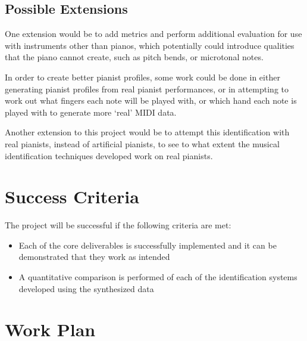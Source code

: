 \documentclass[12pt]{article}
\begin{document}
\subsection{Possible Extensions}
One extension would be to add metrics and perform additional evaluation for use with instruments other than pianos, which potentially could introduce qualities that the piano cannot create, such as pitch bends, or microtonal notes.

In order to create better pianist profiles, some work could be done in either generating pianist profiles from real pianist performances, or in attempting to work out what fingers each note will be played with, or which hand each note is played with to generate more ‘real’ MIDI data.

Another extension to this project would be to attempt this identification with real pianists, instead of artificial pianists, to see to what extent the musical identification techniques developed work on real pianists.

\section{Success Criteria}

The project will be successful if the following criteria are met:
\begin{itemize}
    
  \item
Each of the core deliverables is successfully implemented and it can be demonstrated that they work as intended

\item
A quantitative comparison is performed of each of the identification systems developed using the synthesized data
\end{itemize}

\section{Work Plan}
\end{document}
